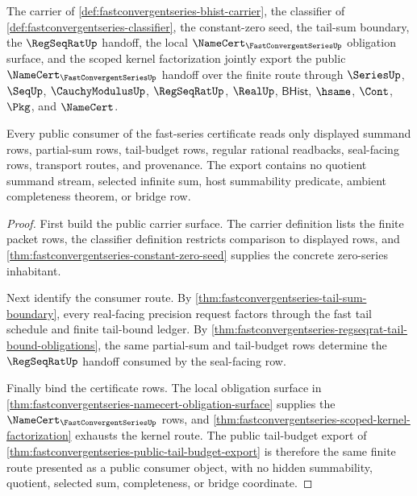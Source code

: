 \begin{theorem}
\label{thm:fastconvergentseries-public-export}
The carrier of \autoref{def:fastconvergentseries-bhist-carrier}, the classifier of \autoref{def:fastconvergentseries-classifier}, the constant-zero seed, the tail-sum boundary, the $\RegSeqRatUp$ handoff, the local $\NameCert_{\FastConvergentSeriesUp}$ obligation surface, and the scoped kernel factorization jointly export the public $\NameCert_{\FastConvergentSeriesUp}$ handoff over the finite route through $\SeriesUp$, $\SeqUp$, $\CauchyModulusUp$, $\RegSeqRatUp$, $\RealUp$, $\mathsf{BHist}$, $\hsame$, $\Cont$, $\Pkg$, and $\NameCert$.

Every public consumer of the fast-series certificate reads only displayed summand rows, partial-sum rows, tail-budget rows, regular rational readbacks, seal-facing rows, transport routes, and provenance. The export contains no quotient summand stream, selected infinite sum, host summability predicate, ambient completeness theorem, or bridge row.
\end{theorem}
\begin{proof}
First build the public carrier surface. The carrier definition lists the finite packet rows, the classifier definition restricts comparison to displayed rows, and \autoref{thm:fastconvergentseries-constant-zero-seed} supplies the concrete zero-series inhabitant.

Next identify the consumer route. By \autoref{thm:fastconvergentseries-tail-sum-boundary}, every real-facing precision request factors through the fast tail schedule and finite tail-bound ledger. By \autoref{thm:fastconvergentseries-regseqrat-tail-bound-obligations}, the same partial-sum and tail-budget rows determine the $\RegSeqRatUp$ handoff consumed by the seal-facing row.

Finally bind the certificate rows. The local obligation surface in \autoref{thm:fastconvergentseries-namecert-obligation-surface} supplies the $\NameCert_{\FastConvergentSeriesUp}$ rows, and \autoref{thm:fastconvergentseries-scoped-kernel-factorization} exhausts the kernel route. The public tail-budget export of \autoref{thm:fastconvergentseries-public-tail-budget-export} is therefore the same finite route presented as a public consumer object, with no hidden summability, quotient, selected sum, completeness, or bridge coordinate.
\end{proof}

